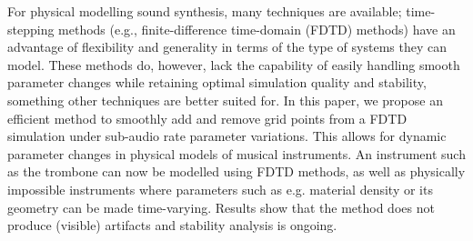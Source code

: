 For physical modelling sound synthesis, many techniques are available; time-stepping methods (e.g., finite-difference time-domain (FDTD) methods) have an advantage of flexibility and generality in terms of the type of systems they can model. These methods do, however, lack the capability of easily handling smooth parameter changes 
while retaining optimal simulation quality and stability, something other techniques are better suited for. In this paper, we propose an efficient method to smoothly add and remove grid points from a FDTD simulation under sub-audio rate parameter variations. This allows for dynamic parameter changes in physical models of musical instruments. An instrument such as the trombone can now be modelled using FDTD methods, as well as physically impossible instruments where parameters such as e.g. material density or its geometry can be made time-varying. Results show that the method does not produce (visible) artifacts and stability analysis is ongoing.

